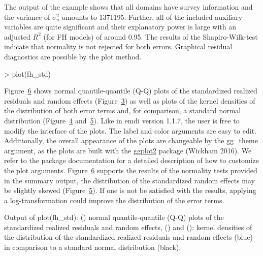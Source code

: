 The output of the example shows that all domains have survey information
and the variance of \(\sigma_u^2\) amounts to 1371195. Further, all of the
included auxiliary variables are quite significant and their explanatory
power is large with an adjusted \(R^2\) (for FH models) of around 0.95.
The results of the Shapiro-Wilk-test indicate that normality is not
rejected for both errors. Graphical residual diagnostics are possible by
the plot method.

\begin{example}
\textgreater{} plot(fh\_std)
\end{example}

Figure~\protect\hyperlink{fig:plot}{6} shows
normal quantile-quantile (Q-Q) plots of the standardized realized
residuals and random effects
(Figure~\protect\hyperlink{fig:plota}{3}) as
well as plots of the kernel densities of the distribution of both error
terms and, for comparison, a standard normal distribution
(Figure~\protect\hyperlink{fig:plotb}{4}
and~\protect\hyperlink{fig:plotc}{5}). Like
in emdi version 1.1.7, the user is free to modify the interface of the
plots. The label and color arguments are easy to edit. Additionally, the
overall appearance of the plots are changeable by the gg\_theme argument,
as the plots are built with the
\href{https://CRAN.R-project.org/package=ggplot2}{ggplot2} package
(Wickham 2016). We refer to the package documentation for a detailed
description of how to customize the plot arguments.
Figure~\protect\hyperlink{fig:plot}{6}
supports the results of the normality tests provided in the summary
output, the distribution of the standardized random effects may be
slightly skewed (Figure~\protect\hyperlink{fig:plotc}{5}). If one is not be satisfied with the results,
applying a log-transformation could improve the distribution of the
error terms.

Output of plot(fh\_std): () normal quantile-quantile (Q-Q)
plots of the standardized realized residuals and random effects, () and
(): kernel densities of the distribution of the standardized realized
residuals and random effects (blue) in comparison to a standard normal
distribution (black).

